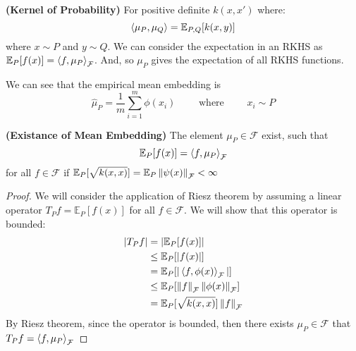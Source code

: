\begin{definition}{\textbf{(Kernel of Probability)}}
    For positive definite $k(x,x')$ where:
    \begin{equation*}
        \left\langle \mu_P, \mu_Q \right\rangle = \mathbb{E}_{P, Q}[k(x, y)]
    \end{equation*}
    where $x\sim P$ and $y \sim Q$. We can consider the expectation in an RKHS as $\mathbb{E}_P[f(x)] = \left\langle f, \mu_P \right\rangle_\mathcal{F}$. And, so $\mu_P$ gives the expectation of all RKHS functions.
\end{definition}

\begin{remark}
    \label{remark:empitical-mean-embedding}
    We can see that the empirical mean embedding is 
    \begin{equation*}
        \hat{\mu}_P = \frac{1}{m}\sum^m_{i=1}\phi(x_i) \qquad \text{ where } \qquad x_i\sim P
    \end{equation*}
\end{remark}

\begin{theorem}{\textbf{(Existance of Mean Embedding)}}
    The element $\mu_P\in\mathcal{F}$ exist, such that 
    \begin{equation*}
        \mathbb{E}_P[f(x)] = \left\langle f, \mu_P \right\rangle_\mathcal{F}    
    \end{equation*}
    for all $f\in\mathcal{F}$ if $\mathbb{E}_P[\sqrt{k(x, x)}] = \mathbb{E}_P\left\lVert\psi(x)\right\rVert_\mathcal{F} < \infty$
\end{theorem}
\begin{proof}
    We will consider the application of Riesz theorem by assuming a linear operator $T_P f = \mathbb{E}_P[f(x)]$ for all $f\in\mathcal{F}$. We will show that this operator is bounded:
    \begin{equation*}
    \begin{aligned}
        |T_P f| &= |\mathbb{E}_P[f(x)]| \\ 
        &\le \mathbb{E}_P[|f(x)|] \\
        &= \mathbb{E}_P[|\left\langle f, \phi(x) \right\rangle_\mathcal{F}|] \\
        &\le \mathbb{E}_P[\left\lVert f\right\rVert_\mathcal{F}\left\lVert\phi(x)\right\rVert_\mathcal{F}] \\
        &= \mathbb{E}_P[\sqrt{k(x,x)}] \left\lVert f\right\rVert_\mathcal{F}
    \end{aligned}
    \end{equation*}
    By Riesz theorem, since the operator is bounded, then there exists $\mu_P\in\mathcal{F}$ that $T_Pf = \left\langle f, \mu_P \right\rangle_\mathcal{F}$
\end{proof}

